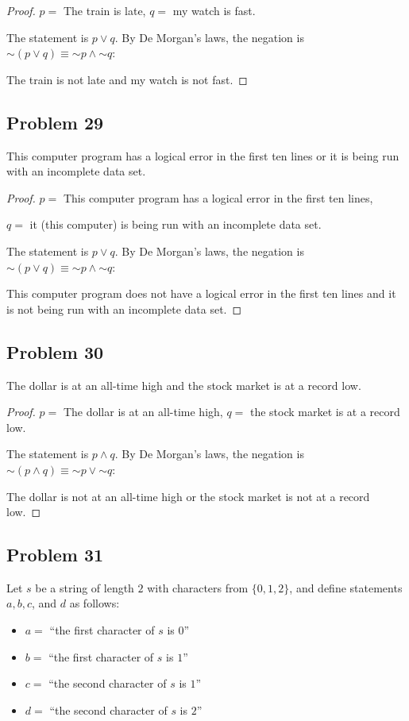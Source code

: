 \documentclass[14pt]{extarticle}
\begin{document}
\begin{proof}
$p =$ The train is late, $q =$ my watch is fast.

The statement is $p \vee q$. By De Morgan's laws, the negation is $\sim(p \vee
q) \equiv {\sim p} \wedge {\sim q}$:

The train is not late and my watch is not fast.
\end{proof}

\subsection{Problem 29}
This computer program has a logical error in the first ten lines or it is being
run with an incomplete data set.

\begin{proof}
$p =$ This computer program has a logical error in the first ten lines,

$q =$ it (this computer) is being run with an incomplete data set.

The statement is $p \vee q$. By De Morgan's laws, the negation is $\sim(p \vee
q) \equiv {\sim p} \wedge {\sim q}$:

This computer program does not have a logical error in the first ten lines and
it is not being run with an incomplete data set.
\end{proof}

\subsection{Problem 30}
The dollar is at an all-time high and the stock market is at a record low.

\begin{proof}
$p =$ The dollar is at an all-time high, $q =$ the stock market is at a record
low.

The statement is $p \wedge q$. By De Morgan's laws, the negation is $\sim(p
\wedge q) \equiv {\sim p} \vee {\sim q}$:

The dollar is not at an all-time high or the stock market is not at a record
low.
\end{proof}

\subsection{Problem 31}
Let $s$ be a string of length $2$ with characters from $\{0, 1, 2\}$, and define
statements $a, b, c$, and $d$ as follows:

\begin{itemize}
\item $a = $ ``the first character of $s$ is $0$''
\item $b = $ ``the first character of $s$ is $1$''
\item $c = $ ``the second character of $s$ is $1$''
\item $d = $ ``the second character of $s$ is $2$''
\end{itemize}
\end{document}
